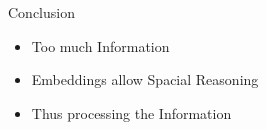 \documentclass[12pt,landscape,english]{beamer}
\begin{document}
\begin{frame}{Conclusion}
	\begin{itemize}
		\item Too much Information
		\item Embeddings allow Spacial Reasoning
		\item Thus processing the Information
	\end{itemize}
		\centering{}
\end{frame}
\end{document}
